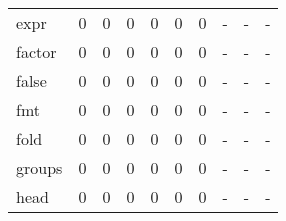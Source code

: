\begin{longtable}{lp{1.3cm}p{1.3cm}p{1.3cm}p{1.3cm}p{1.3cm}p{1.3cm}p{1.3cm}p{1.3cm}p{1.3cm}}
expr      &                      0 &                                             0 &                                            0 &                                           0 &                                            0 &                                          0 &                                    - &                                      - &                                    - \\
factor    &                      0 &                                             0 &                                            0 &                                           0 &                                            0 &                                          0 &                                    - &                                      - &                                    - \\
false     &                      0 &                                             0 &                                            0 &                                           0 &                                            0 &                                          0 &                                    - &                                      - &                                    - \\
fmt       &                      0 &                                             0 &                                            0 &                                           0 &                                            0 &                                          0 &                                    - &                                      - &                                    - \\
fold      &                      0 &                                             0 &                                            0 &                                           0 &                                            0 &                                          0 &                                    - &                                      - &                                    - \\
groups    &                      0 &                                             0 &                                            0 &                                           0 &                                            0 &                                          0 &                                    - &                                      - &                                    - \\
head      &                      0 &                                             0 &                                            0 &                                           0 &                                            0 &                                          0 &                                    - &                                      - &                                    - \\

\end{longtable}
